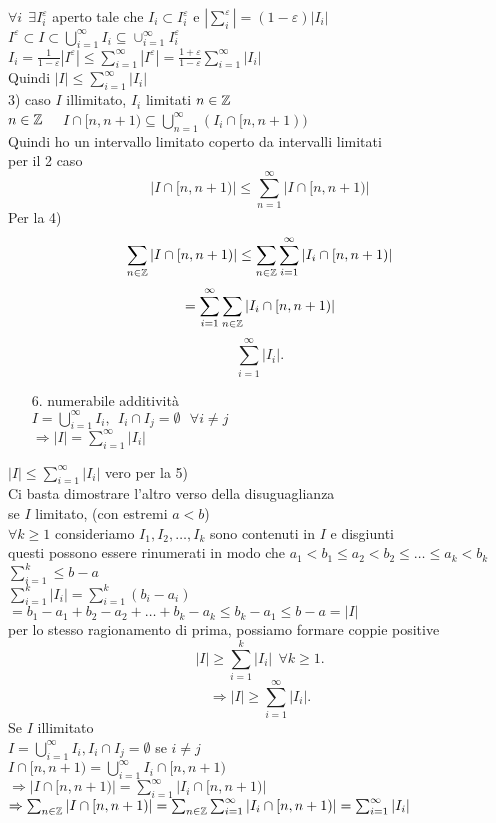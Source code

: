 \documentclass[12px]{article}
\begin{document}
  $\forall i \ \ \exists I^\varepsilon_i$ aperto tale che  $I_i\subset I^\varepsilon_i$ e $| \sum^\varepsilon_{i}| = (1-\varepsilon)|I_i|$\\
  $I^\varepsilon\subset I\subset\bigcup^\infty_{i = 1} I_i\subseteq\cup^\infty_{i=1}I^\varepsilon_i$\\
  $I_i = \frac{1}{1-\varepsilon}|I^\varepsilon| \leq \sum^\infty_{i=1}|I^\varepsilon| = \frac{1 + \varepsilon}{1-\varepsilon} \sum^\infty_{i=1}|I_i|$\\
  Quindi $|I|\leq \sum^\infty_{i=1}|I_i|$\\
  3) caso $I$ illimitato, $I_i$ limitati $n\in\mathbb{Z}$\\
  $n\in\mathbb{Z}$ \ \ $ I\cap [n, n + 1)\subseteq \bigcup^ \infty_{n=1}(I_i\cap[n,n+1))$\\
  Quindi ho un intervallo limitato coperto da intervalli limitati\\
  per il 2 caso
   \[
  |I\cap[n,n+1)|\leq \sum^\infty_{n=1} |I\cap[n,n+1)|
  \] 
  Per la 4)
  \[
  \sum_{n\in\mathbb{Z}} |I\cap[n,n+1)|\leq \sum_{n\in\mathbb{Z}} \sum^\infty_{i=1}|I_i\cap[n,n+1)|
  \]
  \[
	  = \sum^\infty_{i=1} \sum_{n\in\mathbb{Z}} |I_i\cap[n,n+1)| 
  \] 
  \[
   \sum^\infty_{i=1} |I_i|
  .\] 
\begin{enumerate}
	\item[6.] numerabile additività\\
		$I = \bigcup^\infty_{i=1} I_i, \ \ I_i\cap I_j = \emptyset\ \ \ \forall i\neq j$ \\
		 $ \Rightarrow |I| = \sum^\infty_{i=1}|I_i|$ \\
\end{enumerate}
\begin{dimo}
	$|I| \leq \sum^\infty_{i=1}|I_i|$ vero per la 5)\\
	Ci basta dimostrare l'altro verso della disuguaglianza\\
	 se $I$ limitato,  (con estremi $a<b$)\\
	  $\forall k\geq 1$ consideriamo  $I_1,I_2,\ldots,I_k$ sono contenuti in $I$ e disgiunti\\
	  questi possono essere rinumerati in modo che $a_1 < b_1\leq a_2 < b_2 \leq\ldots\leq a_k < b_k$\\
	  $ \sum^k_{i=1}\leq b -a $\\
	  $ \sum^k_{i=1}|I_i| = \sum^k_{i=1}(b_i - a_i)$ \\
	  $= b_1 - a_1 + b_2 - a_2 + \ldots + b_k - a_k\leq b_k-a_1 \leq b - a= |I|$\\
	  per lo stesso ragionamento di prima, possiamo formare coppie positive\\
	  \[
	  |I| \geq \sum^k_{i=1} |I_i| \ \ \forall k\geq 1
	  .\] 
	  \[
	   \Rightarrow |I|\geq \sum^\infty_{i=1}|I_i|
	  .\] 
	  Se $I$ illimitato\\
	  $I = \bigcup^\infty_{i=1}I_i, I_i\cap I_j = \emptyset $ se $i\neq j$\\
	  $I\cap [n,n+1) = \bigcup^\infty_{i=1}I_i\cap[n,n+1)$\\
	   $ \Rightarrow |I\cap[n,n+1)| = \sum^\infty_{i=1}|I_i\cap[n,n+1)|$ \\
	   $ \Rightarrow \sum_{n\in\mathbb{Z}}|I\cap[n,n+1)| = \sum_{n\in\mathbb{Z}} \sum^\infty_{i=1}|I_i\cap[n,n+1)| = \sum^\infty_{i=1}|I_i|$\\
\end{dimo}
\end{document}
